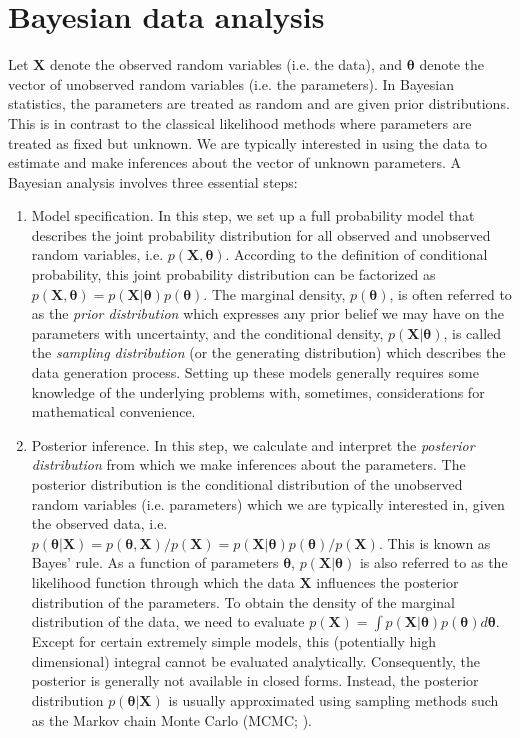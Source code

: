 \documentclass[floatsintext, man]{apa7}
\begin{document}
\section{Bayesian data analysis}
Let $\bm{X}$ denote the observed random variables (i.e. the data), and $
\bm{\theta}$ denote the vector of unobserved random variables (i.e. the
parameters). In Bayesian statistics, the parameters are treated as random and
are given prior distributions. This is in contrast to the classical likelihood
methods where parameters are treated as fixed but unknown. We are typically
interested in using the data to estimate and make inferences about the vector of
unknown parameters. A Bayesian analysis involves three essential steps:
\begin{enumerate}
  \item Model specification. In this step, we set up a full probability model
  that describes the joint probability distribution for all observed and
  unobserved random variables, i.e. $p(\bm{X}, \bm{\theta})$. According to the
  definition of conditional probability, this joint probability distribution can
  be factorized as $p(\bm{X}, \bm{\theta}) = p(\bm{X}|\bm{\theta})p(
  \bm{\theta})$. The marginal density, $p(\bm{\theta})$, is often referred to as
  the \textit{prior distribution} which expresses any prior belief we may have
  on the parameters with uncertainty, and the conditional density, $p(\bm{X}|
  \bm{\theta})$, is called the \textit{sampling distribution} (or the generating
  distribution) which describes the data generation process. Setting up these
  models generally requires some knowledge of the underlying problems with,
  sometimes, considerations for mathematical convenience.

  \item Posterior inference. In this step, we calculate and interpret the
  \textit{posterior distribution} from which we make inferences about the
  parameters. The posterior distribution is the conditional
  distribution of the unobserved random variables (i.e. parameters) which we are
  typically interested in, given the observed data, i.e. $p(\bm{\theta}|\bm{X})
  = p(\bm{\theta}, \bm{X}) / p(\bm{X}) = p(\bm{X}|\bm{\theta})p(\bm{\theta}) /
  p(\bm{X})$. This is known as Bayes' rule. As a function of parameters $
  \bm{\theta}$, $p(\bm{X}|\bm{\theta})$ is also referred to as the likelihood
  function through which the data $\bm{X}$ influences the posterior distribution
  of the parameters. To obtain the density of the marginal distribution of the
  data, we need to evaluate $p(\bm{X}) = \int p(\bm{X}|\bm{\theta})p(
  \bm{\theta}) d\bm{\theta}$. Except for certain extremely simple models, this 
  (potentially high dimensional) integral cannot be evaluated analytically.
  Consequently, the posterior is generally not available in closed forms.
  Instead, the posterior distribution $p(\bm{\theta}|\bm{X})$ is usually
  approximated using sampling methods such as the Markov chain Monte Carlo 
  (MCMC; \cite{neal_probabilistic_1998,gelman_bayesian_2013}).


\end{enumerate}
\end{document}
